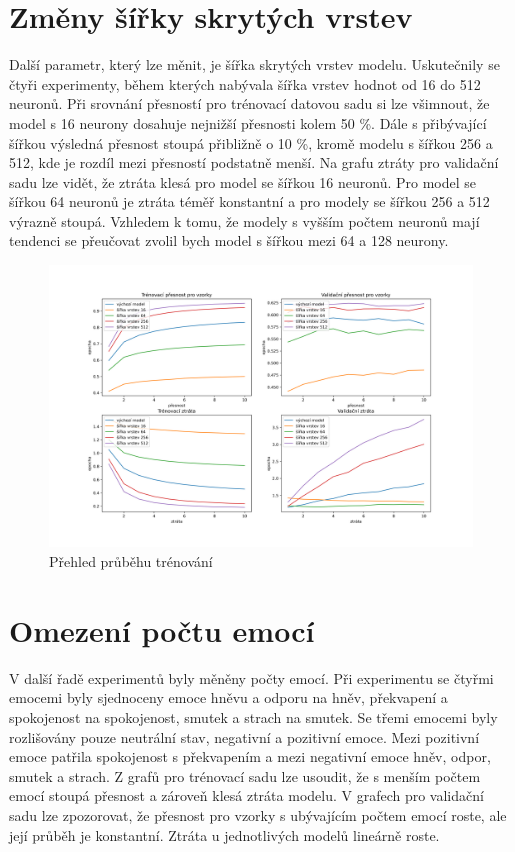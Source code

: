 \documentclass[FM,BP]{tulthesis}
\begin{document}
\section{Změny šířky skrytých vrstev} %
Další parametr, který lze měnit, je šířka skrytých vrstev modelu. Uskutečnily se čtyři experimenty, během kterých nabývala šířka vrstev hodnot od 16 do 512 neuronů. Při srovnání přesností pro trénovací datovou sadu si lze všimnout, že model s 16 neurony dosahuje nejnižší přesnosti kolem 50 \%. Dále s přibývající šířkou výsledná přesnost stoupá přibližně o 10 \%, kromě modelu s šířkou 256 a 512, kde je rozdíl mezi přesností podstatně menší. Na grafu ztráty pro validační sadu lze vidět, že ztráta klesá pro model se šířkou 16 neuronů. Pro model se šířkou 64 neuronů je ztráta téměř konstantní a pro modely se šířkou 256 a 512 výrazně stoupá. Vzhledem k tomu, že modely s vyšším počtem neuronů mají tendenci se přeučovat zvolil bych model s šířkou mezi 64 a 128 neurony.

\begin{figure}[!htbp]
\centerline{\includegraphics[scale=.5]{training_course-width.png}}
\caption{Přehled průběhu trénování}
\label{fig}
\end{figure}
\FloatBarrier

\section{Omezení počtu emocí} %
V další řadě experimentů byly měněny počty emocí. Při experimentu se čtyřmi emocemi byly sjednoceny emoce hněvu a odporu na hněv, překvapení a spokojenost na spokojenost, smutek a strach na smutek. Se třemi emocemi byly rozlišovány pouze neutrální stav, negativní a pozitivní emoce. Mezi pozitivní emoce patřila spokojenost s překvapením a mezi negativní emoce hněv, odpor, smutek a strach. Z grafů pro trénovací sadu lze usoudit, že s menším počtem emocí stoupá přesnost a zároveň klesá ztráta modelu. V grafech pro validační sadu lze zpozorovat, že přesnost pro vzorky s ubývajícím počtem emocí roste, ale její průběh je konstantní. Ztráta u jednotlivých modelů lineárně roste.
\end{document}

